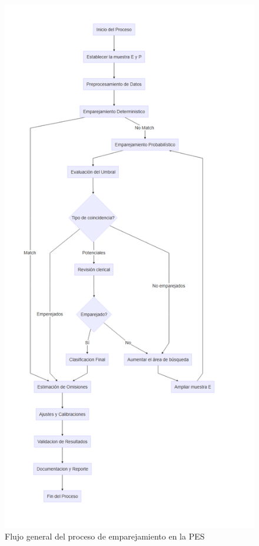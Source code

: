 \documentclass[
  12pt,
]{book}
\begin{document}
\begin{figure}

{\centering \includegraphics[width=1\linewidth]{images/grafo} 

}

\caption{Flujo general del proceso de emparejamiento en la PES}\label{fig:match1q}
\end{figure}
\end{document}
